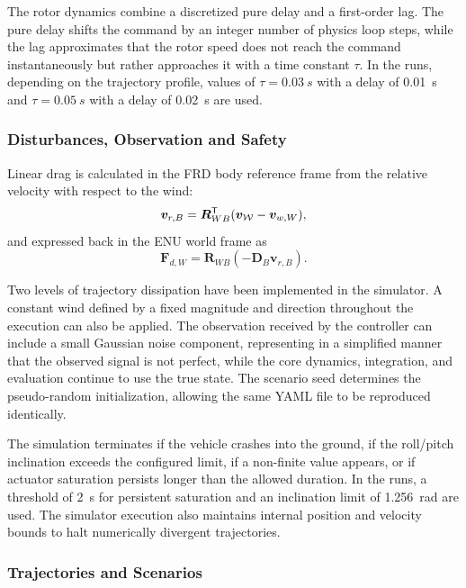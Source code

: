 The rotor dynamics combine a discretized pure delay and a first-order lag. The pure delay shifts the command by an integer number of physics loop steps, while the lag approximates that the rotor speed does not reach the command instantaneously but rather approaches it with a time constant $\tau$. In the runs, depending on the trajectory profile, values of $\tau=\SI{0.03}{s}$ with a delay of \SI{0.01}{s} and $\tau=\SI{0.05}{s}$ with a delay of \SI{0.02}{s} are used.

\subsubsection*{Disturbances, Observation and Safety}
\label{subsubsec:perturbaciones-observacion-seguridad}

Linear drag is calculated in the FRD body reference frame from the relative velocity with respect to the wind:
\begin{equation}
 \bm{v}_{r,B}=\bm{R}_{WB}^{\mathsf{T}}(\bm{v}_{\mathcal{W}}-\bm{v}_{w,W}),
\end{equation}
and expressed back in the ENU world frame as
\begin{equation}
 \bm{F}_{d,W}=\bm{R}_{WB}\left(-\bm{D}_B\bm{v}_{r,B}\right).
 \label{eq:drag-lineal}
\end{equation}

Two levels of trajectory dissipation have been implemented in the simulator. A constant wind defined by a fixed magnitude and direction throughout the execution can also be applied. The observation received by the controller can include a small Gaussian noise component, representing in a simplified manner that the observed signal is not perfect, while the core dynamics, integration, and evaluation continue to use the true state. The scenario seed determines the pseudo-random initialization, allowing the same YAML file to be reproduced identically.

The simulation terminates if the vehicle crashes into the ground, if the roll/pitch inclination exceeds the configured limit, if a non-finite value appears, or if actuator saturation persists longer than the allowed duration. In the runs, a threshold of \SI{2}{s} for persistent saturation and an inclination limit of \SI{1.256}{rad} are used. The simulator execution also maintains internal position and velocity bounds to halt numerically divergent trajectories.

\subsubsection*{Trajectories and Scenarios}

